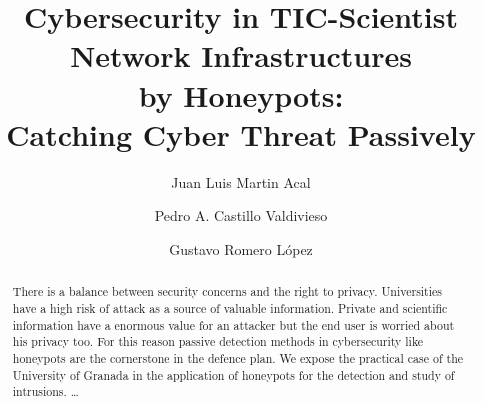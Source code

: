\documentclass[a4paper]{llncs}
\begin{document}
\pagestyle{empty}

\mainmatter

\title{Cybersecurity in TIC-Scientist Network Infrastructures\\by
  Honeypots:\\Catching Cyber Threat Passively}


\author{Juan Luis Martin Acal
\and Pedro A. Castillo Valdivieso
\and Gustavo Romero López} %



\maketitle

\begin{abstract}
There is a balance between security concerns and the right to
privacy. %
  Universities have a high risk of attack as a source of valuable
  information. %
Private and scientific information have a enormous value for an
attacker but the end user is worried about his privacy too. %
 For this reason passive detection methods in cybersecurity like
 honeypots are the cornerstone in the defence plan. We expose the
 practical case of the University of Granada in the application of
 honeypots for the detection and study of intrusions. 
\dots
\end{abstract}
\end{document}
